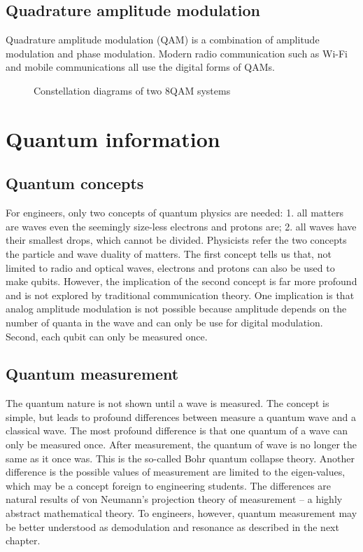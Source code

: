 \documentclass[Letter,11pt]{book}
\begin{document}
\section{Quadrature amplitude modulation}
Quadrature amplitude modulation (QAM) is a combination of amplitude modulation and phase modulation. Modern radio communication such as Wi-Fi and mobile communications all use the digital forms of QAMs.
\begin{figure}[ht]\label{QAM}
\caption{Constellation diagrams of two 8QAM systems}
\end{figure}


\chapter{Quantum information}\label{C-qi}
\section{Quantum concepts}
For engineers, only two concepts of quantum physics are needed: 1. all matters are waves even the seemingly size-less electrons and protons are; 2. all waves have their smallest drops, which cannot be divided. Physicists refer the two concepts the particle and wave duality of matters. The first concept tells us that, not limited to radio and optical waves, electrons and protons can also be used to make qubits. However, the implication of the second concept is far more profound and is not explored by traditional communication theory. One implication is that analog amplitude modulation is not possible because amplitude depends on the number of quanta in the wave and can only be use for digital modulation. Second, each qubit can only be measured once.

\section{Quantum measurement}
The quantum nature is not shown until a wave is measured. The concept is simple, but leads to profound differences between measure a quantum wave and a classical wave. The most profound difference is that one quantum of a wave can only be measured once. After measurement, the quantum of wave is no longer the same as it once was. This is the so-called Bohr quantum collapse theory. Another difference is the possible values of measurement are limited to the eigen-values, which may be a concept foreign to engineering students. The differences are natural results of von Neumann's projection theory of measurement -- a highly abstract mathematical theory. To engineers, however, quantum measurement may be better understood as demodulation and resonance as described in the next chapter. 
\end{document}
